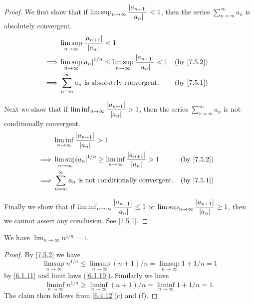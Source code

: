 \begin{proof}
  We first show that if \(\limsup_{n \to \infty} \dfrac{\left\lvert a_{n + 1}\right\rvert}{\left\lvert a_n\right\rvert} < 1\), then the series \(\sum_{n = m}^\infty a_n\) is absolutely convergent.
  \begin{align*}
             & \limsup_{n \to \infty} \dfrac{\abs{a_{n + 1}}}{\abs{a_n}} < 1                                                               \\
    \implies & \limsup_{n \to \infty} \abs{a_n}^{1 / n} \leq \limsup_{n \to \infty} \dfrac{\abs{a_{n + 1}}}{\abs{a_n}} < 1 &  & \by{7.5.2} \\
    \implies & \sum_{n = m}^\infty a_n \text{ is absolutely convergent}.                                                   &  & \by{7.5.1}
  \end{align*}

  Next we show that if \(\liminf_{n \to \infty} \dfrac{\left\lvert a_{n + 1}\right\rvert}{\left\lvert a_n\right\rvert} > 1\), then the series \(\sum_{n = m}^\infty a_n\) is not conditionally convergent.
  \begin{align*}
             & \liminf_{n \to \infty} \dfrac{\abs{a_{n + 1}}}{\abs{a_n}} > 1                                                               \\
    \implies & \limsup_{n \to \infty} \abs{a_n}^{1 / n} \geq \liminf_{n \to \infty} \dfrac{\abs{a_{n + 1}}}{\abs{a_n}} > 1 &  & \by{7.5.2} \\
    \implies & \sum_{n = m}^\infty a_n \text{ is not conditionally convergent}.                                            &  & \by{7.5.1}
  \end{align*}

  Finally we show that if \(\liminf_{n \to \infty} \dfrac{\left\lvert a_{n + 1}\right\rvert}{\left\lvert a_n\right\rvert} \leq 1\) or \(\limsup_{n \to \infty} \dfrac{\left\lvert a_{n + 1}\right\rvert}{\left\lvert a_n\right\rvert} \geq 1\), then we cannot assert any conclusion.
  See \cref{7.5.1}.
\end{proof}

\begin{prop}\label{7.5.4}
  We have \(\lim_{n \to \infty} n^{1 / n} = 1\).
\end{prop}

\begin{proof}
  By \cref{7.5.2} we have
  \[
    \limsup_{n \to \infty} n^{1 / n} \leq \limsup_{n \to \infty} (n + 1) / n = \limsup_{n \to \infty} 1 + 1 / n = 1
  \]
  by \cref{6.1.11} and limit laws (\cref{6.1.19}).
  Similarly we have
  \[
    \liminf_{n \to \infty} n^{1 / n} \geq \liminf_{n \to \infty} (n + 1) / n = \liminf_{n \to \infty} 1 + 1 / n = 1.
  \]
  The claim then follows from \cref{6.4.12}(c) and (f).
\end{proof}


